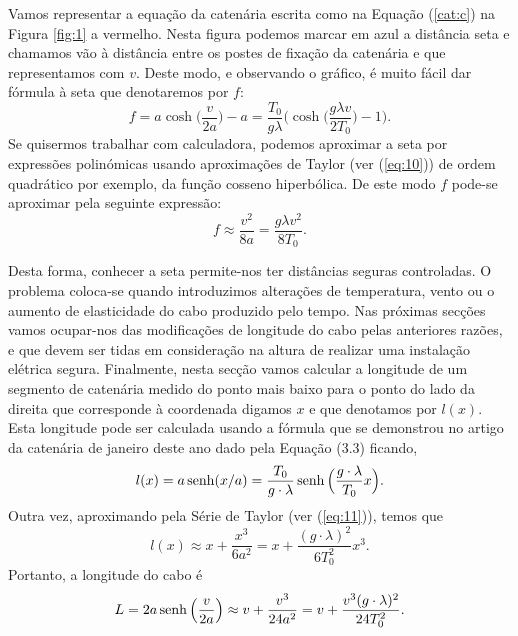 Vamos representar a equação da catenária escrita como na Equação (\ref{cat:c}) na Figura \ref{fig:1} a vermelho. Nesta figura podemos marcar em azul a distância seta e chamamos vão à distância entre os postes de fixação da catenária e que representamos com $v$. Deste modo, e observando o gráfico, é muito fácil dar fórmula à seta que denotaremos por $f$:
\begin{equation}
  \label{eq:4}
  f =  a\cosh\Big(\frac{v}{2a}\Big)-a=
  \frac{T_0}{g\lambda}\Big(\cosh\Big(\frac{g\lambda v}{2T_0}\Big)-1\Big).
\end{equation}
Se quisermos trabalhar com calculadora, podemos aproximar a seta por expressões polinómicas usando aproximações de Taylor (ver (\ref{eq:10})) de ordem quadrático por exemplo, da função cosseno hiperbólica. De este modo $f$ pode-se aproximar pela seguinte expressão:
 \begin{equation}
  \label{eq:12}
  f \approx{} \frac{v^2}{8a} = \frac{g\lambda v^2}{8T_0}.
\end{equation}

Desta forma, conhecer a seta permite-nos ter distâncias seguras controladas. O problema coloca-se quando introduzimos alterações de temperatura, vento ou o aumento de elasticidade do cabo produzido pelo tempo. Nas próximas secções vamos ocupar-nos das modificações de longitude do cabo pelas anteriores razões, e que devem ser tidas em consideração na altura de realizar uma instalação elétrica segura.
Finalmente, nesta secção vamos calcular a longitude de um segmento de catenária medido do ponto mais baixo para o ponto do lado da direita que corresponde à coordenada digamos $x$ e que denotamos por $l(x)$. Esta longitude pode ser calculada usando a fórmula que se demonstrou no artigo da catenária de janeiro deste ano dado pela Equação (3.3) ficando,
\begin{equation}
  \label{eq:3}
  l(x) = a\operatorname{senh}(x/a)=\frac{T_0}{g\cdot\lambda}\operatorname{senh}\Big(\frac{g\cdot\lambda}{T_0}x\Big).
\end{equation}
Outra vez, aproximando pela Série de Taylor (ver (\ref{eq:11})), temos que
\begin{equation}
  \label{eq:14}
  l(x) \approx{} x+\frac{x^3}{6a^2}=x+\frac{(g\cdot\lambda)^2}{6T_0^2}x^3.
\end{equation}
Portanto, a longitude do cabo é
\begin{equation}
  \label{eq:15}
  L = 2a\operatorname{senh}\Big(\frac{v}{2a}\Big)\approx{} v + \frac{v^3}{24a^2} = v
  + \frac{v^3(g\cdot\lambda)^2}{24T_0^2}.
\end{equation}

